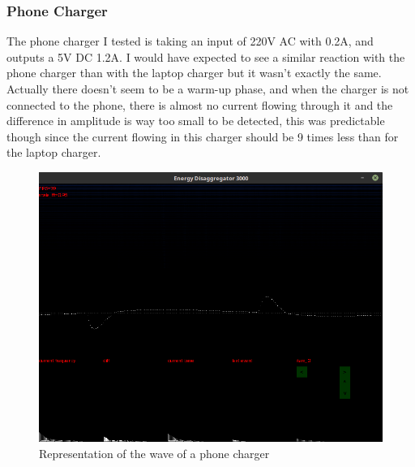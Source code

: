 \subsubsection{Phone Charger}
The phone charger I tested is taking an input of 220V AC with 0.2A, and outputs a 5V DC 1.2A.
I would have expected to see a similar reaction with the phone charger than with the laptop charger but it wasn't exactly the same. Actually there doesn't seem to be a warm-up phase, and when the charger is not connected to the phone, there is almost no current flowing through it and the difference in amplitude is way too small to be detected, this was predictable though since the current flowing in this charger should be 9 times less than for the laptop charger.

\begin{figure}
    \centering
    \includegraphics[trim={0 7cm 0 7cm},clip,width=\textwidth,decodearray={1 0 1 0 1 0}]{img/gui-phone.png}
    \caption{Representation of the wave of a phone charger}
    \label{fig:gui-phone}
\end{figure}

